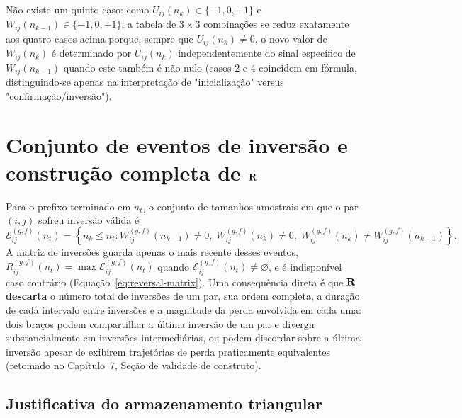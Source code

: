 Não existe um quinto caso: como $U_{ij}(n_k)\in\{-1,0,+1\}$ e $W_{ij}(n_{k-1})\in\{-1,0,+1\}$, a tabela de $3\times3$ combinações se reduz exatamente aos quatro casos acima porque, sempre que $U_{ij}(n_k)\neq0$, o novo valor de $W_{ij}(n_k)$ é determinado por $U_{ij}(n_k)$ independentemente do sinal específico de $W_{ij}(n_{k-1})$ quando este também é não nulo (casos 2 e 4 coincidem em fórmula, distinguindo-se apenas na interpretação de "inicialização" versus "confirmação/inversão").

\section{Conjunto de eventos de inversão e construção completa de \texorpdfstring{$\mathbf{R}$}{R}}
\label{sec:d-reversal-set}

Para o prefixo terminado em $n_t$, o conjunto de tamanhos amostrais em que o par $(i,j)$ sofreu inversão válida é
\begin{equation}
  \mathcal{E}^{(g,f)}_{ij}(n_t)=
  \left\{
    n_k\leq n_t:
    W^{(g,f)}_{ij}(n_{k-1})\neq0,\;
    W^{(g,f)}_{ij}(n_k)\neq0,\;
    W^{(g,f)}_{ij}(n_k)\neq W^{(g,f)}_{ij}(n_{k-1})
  \right\}.
\end{equation}
A matriz de inversões guarda apenas o mais recente desses eventos, $R^{(g,f)}_{ij}(n_t)=\max\mathcal{E}^{(g,f)}_{ij}(n_t)$ quando $\mathcal{E}^{(g,f)}_{ij}(n_t)\neq\varnothing$, e é indisponível caso contrário (Equação~\eqref{eq:reversal-matrix}). Uma consequência direta é que $\mathbf{R}$ \textbf{descarta} o número total de inversões de um par, sua ordem completa, a duração de cada intervalo entre inversões e a magnitude da perda envolvida em cada uma: dois braços podem compartilhar a última inversão de um par e divergir substancialmente em inversões intermediárias, ou podem discordar sobre a última inversão apesar de exibirem trajetórias de perda praticamente equivalentes (retomado no Capítulo~7, Seção de validade de construto).

\subsection{Justificativa do armazenamento triangular}

